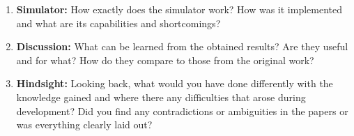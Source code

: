 \documentclass[../review.tex]{subfiles}
\begin{document}
\begin{enumerate}
 \item \textbf{Simulator:} How exactly does the simulator work? How was it implemented and what are its capabilities and shortcomings?
 \item \textbf{Discussion:} What can be learned from the obtained results? Are they useful and for what? How do they compare to those from the original work?
 \item \textbf{Hindsight:} Looking back, what would you have done differently with the knowledge gained and where there any difficulties that arose during development? Did you find any contradictions or ambiguities in the papers or was everything clearly laid out?
\end{enumerate}
\end{document}
